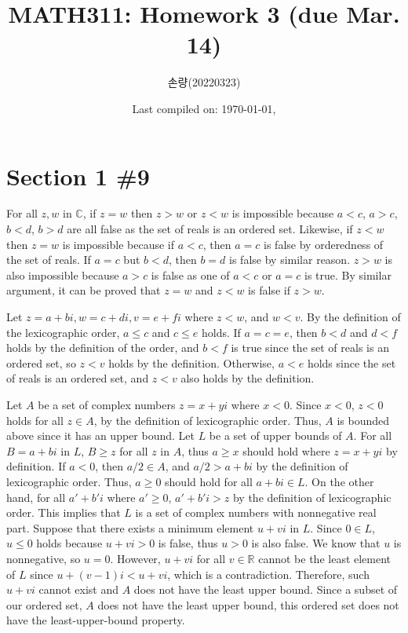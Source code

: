 \documentclass{scrartcl}
\title{MATH311: Homework 3 (due Mar. 14)}
\author{손량(20220323)}
\date{Last compiled on: \today, \currenttime}
\begin{document}
\maketitle

\section{Section 1 \#9}
For all \(z, w\) in \(\mathbb{C}\), if \(z = w\) then \(z > w\) or \(z < w\) is impossible because \(a < c\), \(a > c\), \(b < d\), \(b > d\) are all false as the set of reals is an ordered set.
Likewise, if \(z < w\) then \(z = w\) is impossible because if \(a < c\), then \(a = c\) is false by orderedness of the set of reals.
If \(a = c\) but \(b < d\), then \(b = d\) is false by similar reason.
\(z > w\) is also impossible because \(a > c\) is false as one of \(a < c\) or \(a = c\) is true.
By similar argument, it can be proved that \(z = w\) and \(z < w\) is false if \(z > w\).

Let \(z = a + bi, w = c + di, v = e + fi\) where \(z < w\), and \(w < v\).
By the definition of the lexicographic order, \(a \leq c\) and \(c \leq e\) holds.
If \(a = c = e\), then \(b < d\) and \(d < f\) holds by the definition of the order, and \(b < f\) is true since the set of reals is an ordered set, so \(z < v\) holds by the definition.
Otherwise, \(a < e\) holds since the set of reals is an ordered set, and \(z < v\) also holds by the definition.

Let \(A\) be a set of complex numbers \(z = x + yi\) where \(x < 0\).
Since \(x < 0\), \(z < 0\) holds for all \(z \in A\), by the definition of lexicographic order.
Thus, \(A\) is bounded above since it has an upper bound.
Let \(L\) be a set of upper bounds of \(A\).
For all \(B = a + bi\) in \(L\), \(B \geq z\) for all \(z\) in \(A\), thus \(a \geq x\) should hold where \(z = x + yi\) by definition.
If \(a < 0\), then \(a / 2 \in A\), and \(a / 2 > a + bi\) by the definition of lexicographic order.
Thus, \(a \geq 0\) should hold for all \(a + bi \in L\).
On the other hand, for all \(a' + b'i\) where \(a' \geq 0\), \(a' + b'i > z\) by the definition of lexicographic order.
This implies that \(L\) is a set of complex numbers with nonnegative real part.
Suppose that there exists a minimum element \(u + vi\) in \(L\).
Since \(0 \in L\), \(u \leq 0\) holds because \(u + vi > 0\) is false, thus \(u > 0\) is also false.
We know that \(u\) is nonnegative, so \(u = 0\).
However, \(u + vi\) for all \(v \in \mathbb{R}\) cannot be the least element of \(L\) since \(u + (v - 1)i < u + vi\), which is a contradiction.
Therefore, such \(u + vi\) cannot exist and \(A\) does not have the least upper bound.
Since a subset of our ordered set, \(A\) does not have the least upper bound, this ordered set does not have the least-upper-bound property.
\end{document}
